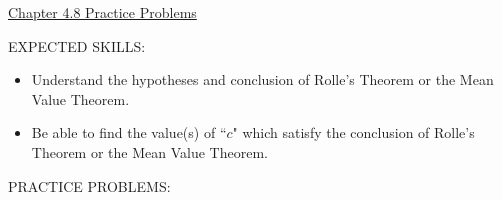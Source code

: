\documentclass[12pt]{article}
\begin{document}
\begin{center}
\underline{\LARGE{Chapter 4.8 Practice Problems}}
\end{center}

\noindent EXPECTED SKILLS:

\begin{itemize}

\item Understand the hypotheses and conclusion of Rolle's Theorem or the Mean Value Theorem.

\item Be able to find the value(s) of ``$c$" which satisfy the conclusion of Rolle's Theorem or the Mean Value Theorem.

\end{itemize}

\noindent PRACTICE PROBLEMS:

\medskip
\end{document}
